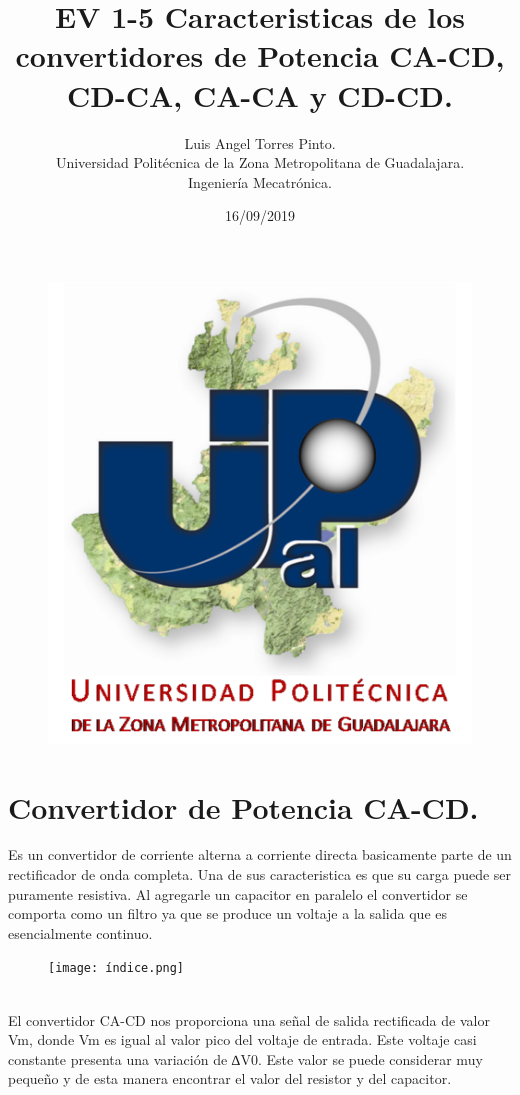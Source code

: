 \documentclass[11pt]{article}
\title{\textbf{EV 1-5 Caracteristicas de los convertidores de Potencia CA-CD, CD-CA, CA-CA y CD-CD.}}
\author{Luis Angel Torres Pinto.\\Universidad Polit\'ecnica de la Zona Metropolitana de Guadalajara.\\Ingenier\'ia Mecatr\'onica.}
\date{16/09/2019}
\begin{document}
\maketitle
\begin{figure}[htp]
\centering
\includegraphics[scale=1.10]{UPZMG.png}
\caption{}
\label{}
\end{figure}
\section{Convertidor de Potencia CA-CD.}
Es un convertidor de corriente alterna a corriente directa basicamente parte de un rectificador de onda completa. Una de sus caracteristica es que su carga puede ser puramente resistiva. Al agregarle un capacitor en paralelo el convertidor se comporta como un filtro ya que se produce un voltaje a la salida que es esencialmente continuo. 
\begin{figure}[htp]
\centering
\texttt{[image: índice.png]}
\caption{}
\label{}
\end{figure}
\\El convertidor CA-CD nos proporciona una se\~nal de salida rectificada de valor Vm, donde  Vm es igual al valor pico del voltaje de entrada. Este voltaje casi constante presenta una variaci\'on de ∆V0. Este valor se puede considerar muy pequeño y de esta manera encontrar el valor del resistor y del capacitor.
\end{document}
